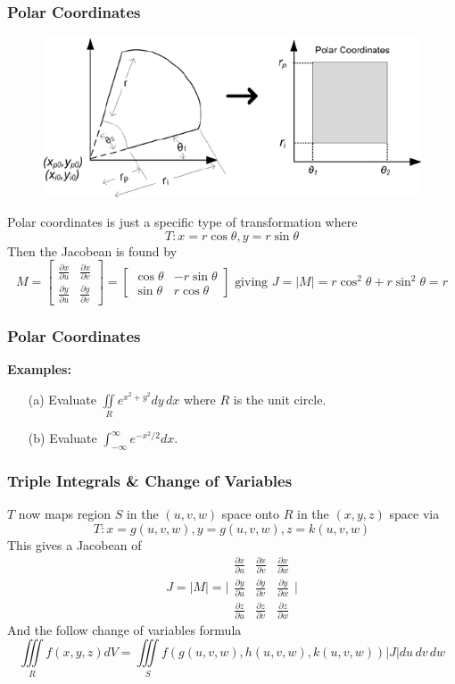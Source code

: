 \documentclass{beamer}
\begin{document}
\begin{frame}
\frametitle{Polar Coordinates}
\begin{figure}

	\includegraphics[height=.4\textheight]{polar.png}\\
	\hspace*{10pt}\hbox{}
\end{figure}
Polar coordinates is just a specific type of transformation where $$T: x=r\cos \theta, y=r\sin \theta$$ Then the Jacobean is found by
$$M = \begin{bmatrix}
\frac{\partial x}{\partial u} & 	\frac{\partial x}{\partial v}\\
\frac{\partial y}{\partial u} & 	\frac{\partial y}{\partial v}
\end{bmatrix}  = \begin{bmatrix} \cos \theta & -r\sin \theta \\ \sin \theta & r\cos \theta \end{bmatrix} \mbox{ giving } J=|M| = r\cos^2 \theta + r\sin^2 \theta = r$$

\end{frame}


\begin{frame}
\frametitle{Polar Coordinates}
\textbf{Examples:}
\begin{itemize}
	\item[(a)] Evaluate $\iint\limits_{R} e^{x^2+y^2} dy\,dx$ where $R$ is the unit circle.
	\item[(b)] Evaluate $\int_{-\infty}^\infty e^{-x^2/2}dx$.
\end{itemize}
\end{frame}


\begin{frame}
\frametitle{Triple Integrals \& Change of Variables}
$T$ now maps region $S$ in the $(u,v,w)$ space onto $R$ in the $(x,y,z)$ space via
$$T: x=g(u,v,w),y=g(u,v,w),z=k(u,v,w)$$
This gives a Jacobean of 
$$J=|M| = \Bigg|\begin{matrix}
\frac{\partial x}{\partial u} & \frac{\partial x}{\partial v} & \frac{\partial x}{\partial w}\\
\frac{\partial y}{\partial u} & \frac{\partial y}{\partial v} & \frac{\partial y}{\partial w}\\
\frac{\partial z}{\partial u} & \frac{\partial z}{\partial v} & \frac{\partial z}{\partial w}
\end{matrix} \Bigg|$$
And the follow change of variables formula
$$\iiint\limits_{R} f(x,y,z)dV = \iiint\limits_{S} f(g(u,v,w),h(u,v,w),k(u,v,w)) |J| du\, dv\, dw$$
\end{frame}
\end{document}
